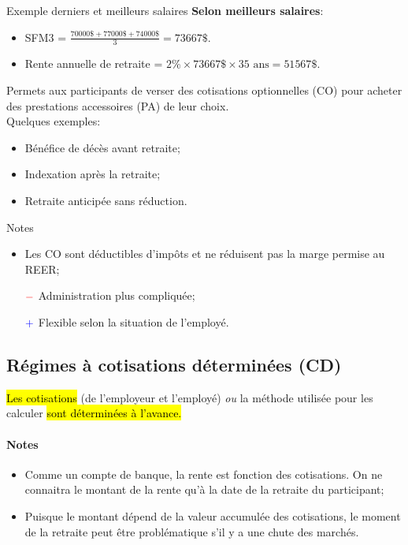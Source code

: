 \documentclass[10pt, french]{article}
\begin{document}
\begin{multicols*}{3}
\begin{conceptgen}{Exemple derniers et meilleurs salaires}
\textbf{Selon meilleurs salaires}:
\begin{itemize}
	\item	SFM3 = $\frac{70 000\$ + 77 000\$ + 74 000\$}{3} = 73 667\$$.
	\item	Rente annuelle de retraite = $2\% \times 73 667\$ \times 35 \text{ ans} = 51 567\$$.
\end{itemize}
\end{conceptgen}

\begin{definitionNOHFILL}
Permets aux participants de verser des cotisations optionnelles (CO) pour acheter des prestations accessoires (PA) de leur choix.\\

Quelques exemples:
\begin{itemize}[leftmargin = *]
	\item	Bénéfice de décès avant retraite;
	\item	Indexation après la retraite;
	\item	Retraite anticipée sans réduction.
\end{itemize}

Notes
\begin{itemize}[leftmargin = *]
	\item	Les CO sont déductibles d'impôts et ne réduisent pas la marge permise au REER;
	\item[$\color{red}-$]	Administration plus compliquée;
	\item[$\color{blue}+$]	Flexible selon la situation de l'employé.
\end{itemize}
\end{definitionNOHFILL}


\columnbreak
\subsection{Régimes à cotisations déterminées (CD)}

\begin{definitionNOHFILL}[Description]
\hl{Les cotisations} (de l'employeur et l'employé) \textit{ou} la méthode utilisée pour les calculer \hl{sont déterminées à l'avance.}

\paragraph{Notes}
\begin{itemize}[leftmargin = *]
	\item	Comme un compte de banque, la rente est fonction des cotisations. On ne connaitra le montant de la rente qu'à la date de la retraite du participant;
	\item	Puisque le montant dépend de la valeur accumulée des cotisations, le moment de la retraite peut être problématique s'il y a une chute des marchés.
\end{itemize}
\end{definitionNOHFILL}



\end{multicols*}
\end{document}
